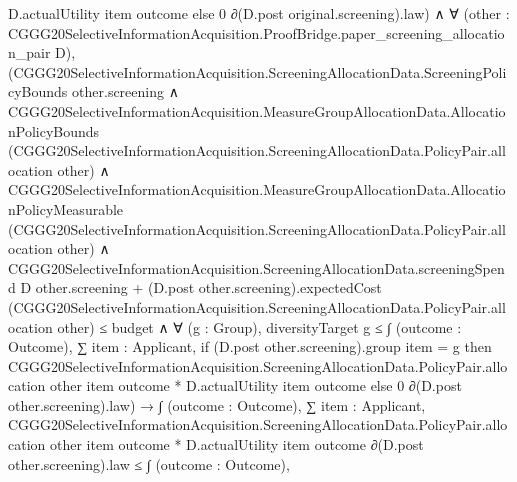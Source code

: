 \documentclass[10pt]{article}
\begin{document}
\begin{ReviewVerbatim}
                                            D.actualUtility item outcome
                                        else 0 ∂(D.post original.screening).law) ∧
                        ∀ (other : CGGG20SelectiveInformationAcquisition.ProofBridge.paper_screening_allocation_pair D),
                          (CGGG20SelectiveInformationAcquisition.ScreeningAllocationData.ScreeningPolicyBounds
                                other.screening ∧
                              CGGG20SelectiveInformationAcquisition.MeasureGroupAllocationData.AllocationPolicyBounds
                                  (CGGG20SelectiveInformationAcquisition.ScreeningAllocationData.PolicyPair.allocation
                                    other) ∧
                                CGGG20SelectiveInformationAcquisition.MeasureGroupAllocationData.AllocationPolicyMeasurable
                                    (CGGG20SelectiveInformationAcquisition.ScreeningAllocationData.PolicyPair.allocation
                                      other) ∧
                                  CGGG20SelectiveInformationAcquisition.ScreeningAllocationData.screeningSpend D
                                          other.screening +
                                        (D.post other.screening).expectedCost
                                          (CGGG20SelectiveInformationAcquisition.ScreeningAllocationData.PolicyPair.allocation
                                            other) ≤
                                      budget ∧
                                    ∀ (g : Group),
                                      diversityTarget g ≤
                                        ∫ (outcome : Outcome),
                                          ∑ item : Applicant,
                                            if (D.post other.screening).group item = g then
                                              CGGG20SelectiveInformationAcquisition.ScreeningAllocationData.PolicyPair.allocation
                                                  other item outcome *
                                                D.actualUtility item outcome
                                            else 0 ∂(D.post other.screening).law) →
                            ∫ (outcome : Outcome),
                                ∑ item : Applicant,
                                  CGGG20SelectiveInformationAcquisition.ScreeningAllocationData.PolicyPair.allocation
                                      other item outcome *
                                    D.actualUtility item outcome ∂(D.post other.screening).law ≤
                              ∫ (outcome : Outcome),

\end{ReviewVerbatim}
\end{document}
